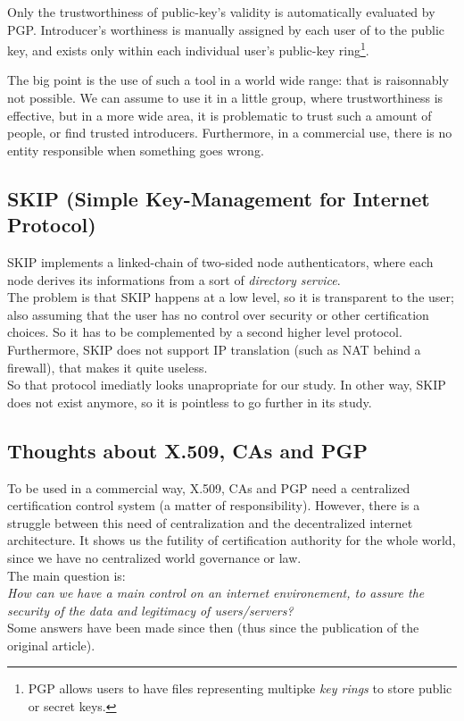 \documentclass[journal, a4paper]{IEEEtran}
\begin{document}
Only the trustworthiness of public-key's validity is automatically evaluated by PGP. Introducer's worthiness is manually assigned by each user of to the public key, and exists only within each individual user's public-key ring\footnote{PGP allows users to have files representing multipke \textit{key rings} to store public or secret keys\cite{caronni2000}.}.

The big point is the use of such a tool in a world wide range: that is raisonnably not possible. We can assume to use it in a little group, where trustworthiness is effective, but in a more wide area, it is problematic to trust such a amount of people, or find trusted introducers. Furthermore, in a commercial use, there is no entity responsible when something goes wrong.


\subsection{SKIP (Simple Key-Management for Internet Protocol)}
\label{skip}

SKIP implements a linked-chain of two-sided node authenticators, where each node derives its informations from a sort of \textit{directory service}.\\
The problem is that SKIP happens at a low level, so it is transparent to the user; also assuming that the user has no control over security or other certification choices. So it has to be complemented by a second higher level protocol. Furthermore, SKIP does not support IP translation (such as NAT behind a firewall), that makes it quite useless.\\
So that protocol imediatly looks unapropriate for our study. In other way, SKIP does not exist anymore, so it is pointless to go further in its study.


\subsection{Thoughts about X.509, CAs and PGP}
\label{thoughts_old}

To be used in a commercial way, X.509, CAs and PGP need a centralized certification control system (a matter of responsibility).
However, there is a struggle between this need of centralization and the decentralized internet architecture.
It shows us the futility of certification authority for the whole world, since we have no centralized world governance or law.\\
The main question is:\\
\textit{How can we have a main control on an internet environement, to assure the security of the data and legitimacy of users/servers?}\\
Some answers have been made since then (thus since the publication of the original article).
\end{document}
